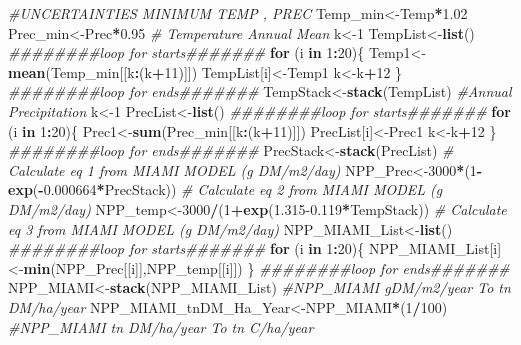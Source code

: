 \documentclass[
  10pt,
  b5paper,
]{book}
\newenvironment{Shaded}{\begin{snugshade}}{\end{snugshade}}
\newcommand{\CommentTok}[1]{\textcolor[rgb]{0.56,0.35,0.01}{\textit{#1}}}
\newcommand{\ControlFlowTok}[1]{\textcolor[rgb]{0.13,0.29,0.53}{\textbf{#1}}}
\newcommand{\DecValTok}[1]{\textcolor[rgb]{0.00,0.00,0.81}{#1}}
\newcommand{\FloatTok}[1]{\textcolor[rgb]{0.00,0.00,0.81}{#1}}
\newcommand{\KeywordTok}[1]{\textcolor[rgb]{0.13,0.29,0.53}{\textbf{#1}}}
\newcommand{\NormalTok}[1]{#1}
\newcommand{\OperatorTok}[1]{\textcolor[rgb]{0.81,0.36,0.00}{\textbf{#1}}}
\begin{document}
\begin{Shaded}
\begin{Highlighting}[]
\CommentTok{#UNCERTAINTIES MINIMUM TEMP , PREC}
\NormalTok{Temp_min<-Temp}\OperatorTok{*}\FloatTok{1.02}
\NormalTok{Prec_min<-Prec}\OperatorTok{*}\FloatTok{0.95}
\CommentTok{# Temperature Annual Mean }
\NormalTok{k<-}\DecValTok{1}
\NormalTok{TempList<-}\KeywordTok{list}\NormalTok{()}
\CommentTok{########loop for starts#######}
\ControlFlowTok{for}\NormalTok{ (i }\ControlFlowTok{in} \DecValTok{1}\OperatorTok{:}\DecValTok{20}\NormalTok{)\{}
\NormalTok{Temp1<-}\KeywordTok{mean}\NormalTok{(Temp_min[[k}\OperatorTok{:}\NormalTok{(k}\OperatorTok{+}\DecValTok{11}\NormalTok{)]])}
\NormalTok{TempList[i]<-Temp1}
\NormalTok{k<-k}\OperatorTok{+}\DecValTok{12}
\NormalTok{\}}
\CommentTok{########loop for ends#######}
\NormalTok{TempStack<-}\KeywordTok{stack}\NormalTok{(TempList)}
\CommentTok{#Annual Precipitation}
\NormalTok{k<-}\DecValTok{1}
\NormalTok{PrecList<-}\KeywordTok{list}\NormalTok{()}
\CommentTok{########loop for starts#######}
\ControlFlowTok{for}\NormalTok{ (i }\ControlFlowTok{in} \DecValTok{1}\OperatorTok{:}\DecValTok{20}\NormalTok{)\{}
\NormalTok{Prec1<-}\KeywordTok{sum}\NormalTok{(Prec_min[[k}\OperatorTok{:}\NormalTok{(k}\OperatorTok{+}\DecValTok{11}\NormalTok{)]])}
\NormalTok{PrecList[i]<-Prec1}
\NormalTok{k<-k}\OperatorTok{+}\DecValTok{12}
\NormalTok{\}}
\CommentTok{########loop for ends#######}
\NormalTok{PrecStack<-}\KeywordTok{stack}\NormalTok{(PrecList)}
\CommentTok{# Calculate eq 1 from MIAMI MODEL (g DM/m2/day)}
\NormalTok{NPP_Prec<-}\DecValTok{3000}\OperatorTok{*}\NormalTok{(}\DecValTok{1}\OperatorTok{-}\KeywordTok{exp}\NormalTok{(}\OperatorTok{-}\FloatTok{0.000664}\OperatorTok{*}\NormalTok{PrecStack))}
\CommentTok{# Calculate eq 2 from MIAMI MODEL (g DM/m2/day)}
\NormalTok{NPP_temp<-}\DecValTok{3000}\OperatorTok{/}\NormalTok{(}\DecValTok{1}\OperatorTok{+}\KeywordTok{exp}\NormalTok{(}\FloatTok{1.315-0.119}\OperatorTok{*}\NormalTok{TempStack))}
\CommentTok{# Calculate eq 3 from MIAMI MODEL (g DM/m2/day)}
\NormalTok{NPP_MIAMI_List<-}\KeywordTok{list}\NormalTok{()}
\CommentTok{########loop for starts#######}
\ControlFlowTok{for}\NormalTok{ (i }\ControlFlowTok{in} \DecValTok{1}\OperatorTok{:}\DecValTok{20}\NormalTok{)\{}
\NormalTok{NPP_MIAMI_List[i]<-}\KeywordTok{min}\NormalTok{(NPP_Prec[[i]],NPP_temp[[i]])}
\NormalTok{\}}
\CommentTok{########loop for ends#######}
\NormalTok{NPP_MIAMI<-}\KeywordTok{stack}\NormalTok{(NPP_MIAMI_List)}
\CommentTok{#NPP_MIAMI gDM/m2/year To tn DM/ha/year}
\NormalTok{NPP_MIAMI_tnDM_Ha_Year<-NPP_MIAMI}\OperatorTok{*}\NormalTok{(}\DecValTok{1}\OperatorTok{/}\DecValTok{100}\NormalTok{)}
\CommentTok{#NPP_MIAMI tn DM/ha/year To tn C/ha/year}


\end{Highlighting}
\end{Shaded}
\end{document}
